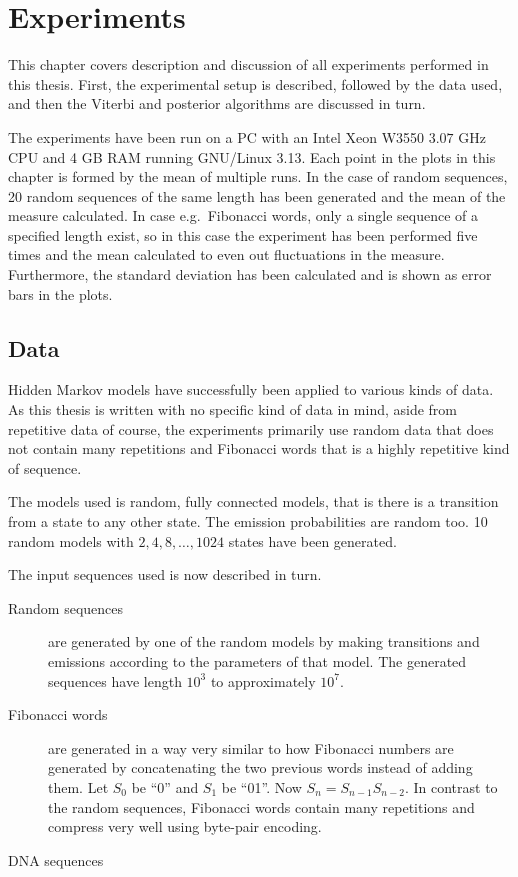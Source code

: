 \chapter{Experiments}
\label{cha:experiments}

This chapter covers description and discussion of all experiments performed in
this thesis. First, the experimental setup is described, followed by the data
used, and then the Viterbi and posterior algorithms are discussed in turn.

The experiments have been run on a PC with an Intel Xeon W3550 $3.07$ GHz CPU
and 4 GB RAM running GNU/Linux 3.13. Each point in the plots in this chapter is
formed by the mean of multiple runs. In the case of random sequences, 20 random
sequences of the same length has been generated and the mean of the measure
calculated. In case e.g.\ Fibonacci words, only a single sequence of a
specified length exist, so in this case the experiment has been performed five
times and the mean calculated to even out fluctuations in the
measure. Furthermore, the standard deviation has been calculated and is shown
as error bars in the plots.

\section{Data}
\label{sec:data}

Hidden Markov models have successfully been applied to various kinds of
data.  As this thesis is written with no specific kind of
data in mind, aside from repetitive data of course, the experiments primarily
use random data that does not contain many repetitions and Fibonacci words that
is a highly repetitive kind of sequence. 

The models used is random, fully connected models, that is there is a
transition from a state to any other state. The emission probabilities are
random too. 10 random models with $2, 4, 8, \dots, 1024$ states have been
generated.

The input sequences used is now described in turn.

\begin{description}
\item[Random sequences] are generated by one of the random models by making
  transitions and emissions according to the parameters of that model. The
  generated sequences have length $10^3$ to approximately $10^7$.
\item[Fibonacci words] are generated in a way very similar to how Fibonacci
  numbers are generated by concatenating the two previous words instead of
  adding them. Let $S_0$ be ``0'' and $S_1$ be ``01''. Now
  $S_n=S_{n-1}S_{n-2}$. In contrast to the random sequences, Fibonacci words
  contain many repetitions and compress very well using byte-pair
  encoding. 
\item[DNA sequences] 
\end{description}

